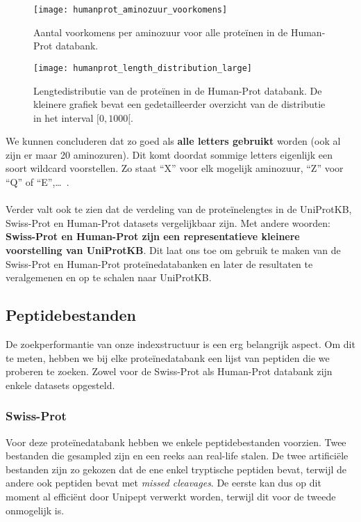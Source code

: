 \begin{figure}[ht]
    \centering
    \texttt{[image: humanprot\_aminozuur\_voorkomens]}
    \caption{Aantal voorkomens per aminozuur voor alle proteïnen in de Human-Prot databank.}
    \label{fig:humanprot_aminozuur}
\end{figure}

\begin{figure}[ht]
    \centering
    \texttt{[image: humanprot\_length\_distribution\_large]}
    \caption{Lengtedistributie van de proteïnen in de Human-Prot databank. De kleinere grafiek bevat een gedetailleerder overzicht van de distributie in het interval $[0, 1000[$.}\label{fig:humanprot_length}
\end{figure}

We kunnen concluderen dat zo goed als \textbf{alle letters gebruikt} worden (ook al zijn er maar 20 aminozuren).
Dit komt doordat sommige letters eigenlijk een soort wildcard voorstellen.
Zo staat ``X'' voor elk mogelijk aminozuur, ``Z'' voor ``Q'' of ``E'',\ldots~\cite{amino_acid_codes}.
\\ \\
Verder valt ook te zien dat de verdeling van de proteïnelengtes in de UniProtKB, Swiss-Prot en Human-Prot datasets vergelijkbaar zijn.
Met andere woorden: \textbf{Swiss-Prot en Human-Prot zijn een representatieve kleinere voorstelling van UniProtKB\@}.
Dit laat ons toe om gebruik te maken van de Swiss-Prot en Human-Prot proteïnedatabanken en later de resultaten te veralgemenen en op te schalen naar UniProtKB\@.

\subsection{Peptidebestanden}\label{subsec:peptide-zoek-bestanden}
De zoekperformantie van onze indexstructuur is een erg belangrijk aspect.
Om dit te meten, hebben we bij elke proteïnedatabank een lijst van peptiden die we proberen te zoeken.
Zowel voor de Swiss-Prot als Human-Prot databank zijn enkele datasets opgesteld.

\subsubsection{Swiss-Prot}
Voor deze proteïnedatabank hebben we enkele peptidebestanden voorzien.
Twee bestanden die gesampled zijn en een reeks aan real-life stalen.
De twee artificiële bestanden zijn zo gekozen dat de ene enkel tryptische peptiden bevat, terwijl de andere ook peptiden bevat met \textit{missed cleavages}.
De eerste kan dus op dit moment al efficiënt door Unipept verwerkt worden, terwijl dit voor de tweede onmogelijk is.

